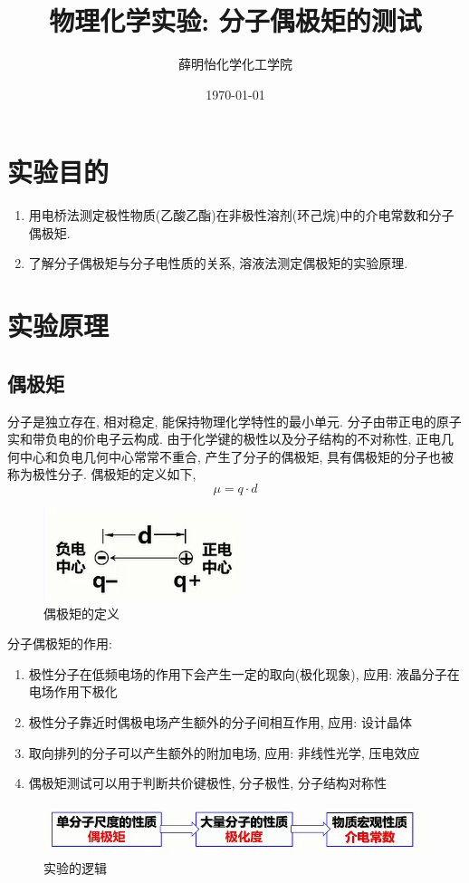 \documentclass[a4paper]{article}
\title{物理化学实验: 分子偶极矩的测试}
\author{薛明怡\quad 151250177\quad 化学化工学院}
\date{\today}
\begin{document}
\maketitle
\section{实验目的}
\begin{enumerate}
\item 用电桥法测定极性物质(乙酸乙酯)在非极性溶剂(环己烷)中的介电常数和分子偶极矩.
\item 了解分子偶极矩与分子电性质的关系, 溶液法测定偶极矩的实验原理.
\end{enumerate}
\section{实验原理}
\subsection{偶极矩}
分子是独立存在, 相对稳定, 能保持物理化学特性的最小单元. 
分子由带正电的原子实和带负电的价电子云构成. 
由于化学键的极性以及分子结构的不对称性, 正电几何中心和负电几何中心常常不重合,
产生了分子的偶极矩, 具有偶极矩的分子也被称为极性分子. 偶极矩的定义如下,
\begin{equation}
	\mu = q \cdot d
\end{equation}
\begin{figure}[H]
	\begin{center}
		\includegraphics[width = 0.3\paperwidth]{fig/definition.png}
	\end{center}
	\caption{偶极矩的定义}
\end{figure}
分子偶极矩的作用: 
\begin{enumerate}
	\item 极性分子在低频电场的作用下会产生一定的取向(极化现象), 应用: 液晶分子在电场作用下极化
	\item 极性分子靠近时偶极电场产生额外的分子间相互作用, 应用: 设计晶体
	\item 取向排列的分子可以产生额外的附加电场, 应用: 非线性光学, 压电效应
	\item 偶极矩测试可以用于判断共价键极性, 分子极性, 分子结构对称性
\end{enumerate}
\begin{figure}[H]
	\centering
	\includegraphics[width = 0.5\paperwidth]{fig/logic.png}
	\caption{实验的逻辑}
\end{figure}
\end{document}
